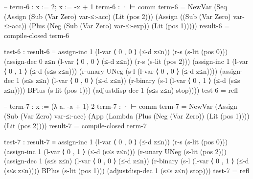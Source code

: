 \documentclass{article}
\begin{document}
\begin{prev}
\begin{code}
-- term-6 : x := 2; x := -x + 1
term-6 : · ⊢ comm
term-6 = 
    NewVar 
        (Seq 
            (Assign 
                (Sub (Var Zero) var-≤:-acc) 
                (Lit (pos 2)))
            (Assign 
                ((Sub (Var Zero) var-≤:-acc)) 
                (Plus 
                    (Neg (Sub (Var Zero) var-≤:-exp)) 
                    (Lit (pos 1)))))
result-6 = compile-closed term-6

test-6 : result-6 ≡ 
    assign-inc 1 
    (l-var ⟨ 0 , 0 ⟩ (≤-d z≤n)) 
    (r-s (s-lit (pos 0)))
    (assign-dec 0 z≤n 
        (l-var ⟨ 0 , 0 ⟩ (≤-d z≤n)) 
        (r-s (s-lit (pos 2)))
        (assign-inc 1 
            (l-var ⟨ 0 , 1 ⟩ (≤-d (s≤s z≤n)))
            (r-unary UNeg (s-l (l-var ⟨ 0 , 0 ⟩ (≤-d z≤n))))
            (assign-dec 1 (s≤s z≤n) 
                (l-var ⟨ 0 , 0 ⟩ (≤-d z≤n))
                (r-binary 
                    (s-l (l-var ⟨ 0 , 1 ⟩ (≤-d (s≤s z≤n)))) 
                    BPlus
                    (s-lit (pos 1)))
                (adjustdisp-dec 1 (s≤s z≤n) stop))))
test-6 = refl


-- term-7 : x := (λ a. -a + 1) 2
term-7 : · ⊢ comm
term-7 = 
    NewVar 
        (Assign 
            (Sub (Var Zero) var-≤:-acc) 
            (App 
                (Lambda 
                    (Plus 
                        (Neg (Var Zero))
                        (Lit (pos 1)))) 
                (Lit (pos 2))))
result-7 = compile-closed term-7

test-7 : result-7 ≡
   assign-inc 1 
   (l-var ⟨ 0 , 0 ⟩ (≤-d z≤n)) 
   (r-s (s-lit (pos 0)))
    (assign-inc 1 
        (l-var ⟨ 0 , 1 ⟩ (≤-d (s≤s z≤n)))
        (r-unary UNeg (s-lit (pos 2)))
        (assign-dec 1 (s≤s z≤n) 
            (l-var ⟨ 0 , 0 ⟩ (≤-d z≤n))
            (r-binary 
                (s-l (l-var ⟨ 0 , 1 ⟩ (≤-d (s≤s z≤n)))) 
                BPlus
                (s-lit (pos 1)))
            (adjustdisp-dec 1 (s≤s z≤n) stop)))
test-7 = refl
\end{code}
\end{prev}
\end{document}
